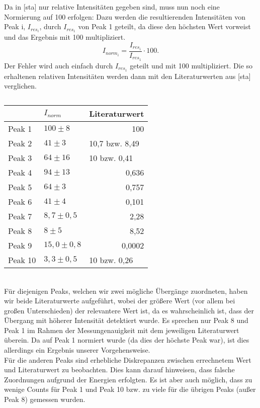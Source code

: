 Da in [sta] nur relative Intensitäten gegeben sind, muss nun noch eine Normierung auf 100 erfolgen: Dazu werden die resultierenden Intensitäten von Peak i, $I_{res_{i}}$, durch $I_{res_{1}}$ von Peak 1 geteilt, da diese den höchsten Wert vorweist und das Ergebnis mit 100 multipliziert. \[I_{norm_{i}}=\frac{I_{res_{i}}}{I_{res_{1}}}\cdot 100.\] 
Der Fehler wird auch einfach durch $I_{res_{1}}$ geteilt und mit 100 multipliziert. Die so erhaltenen relativen Intensitäten werden dann mit den Literaturwerten aus [sta] verglichen.
\begin{table}[htbp]
\begin{center}
\caption{}
\begin{tabular}{|l|l|r|}
\hline
 & $I_{norm}$ & \multicolumn{1}{l|}{Literaturwert} \\ \hline
Peak 1 & $100\pm8$ & 100 \\ \hline
Peak 2 & $41\pm3$ & \multicolumn{1}{l|}{10,7 bzw. 8,49} \\ \hline
Peak 3 & $64\pm16$ & \multicolumn{1}{l|}{10 bzw. 0,41} \\ \hline
Peak 4 & $94\pm13$ & 0,636 \\ \hline
Peak 5 & $64\pm3$ & 0,757 \\ \hline
Peak 6 & $41\pm4$ & 0,101 \\ \hline
Peak 7 & $8,7\pm0,5$ & 2,28 \\ \hline
Peak 8 & $8\pm5$ & 8,52 \\ \hline
Peak 9 & $15,0\pm0,8$ & 0,0002 \\ \hline
Peak 10 & $3,3\pm0,5$ & \multicolumn{1}{l|}{10 bzw. 0,26} \\ \hline
\end{tabular}
\end{center}
\label{}
\end{table}
~\\
Für diejenigen Peaks, welchen wir zwei mögliche Übergänge zuordneten, haben wir beide Literaturwerte aufgeführt, wobei der größere Wert (vor allem bei großen Unterschieden) der relevantere Wert ist, da es wahrscheinlich ist, dass der Übergang mit höherer Intensität detektiert wurde.
Es sprechen nur Peak 8 und Peak 1 im Rahmen der Messungenauigkeit mit dem jeweiligen Literaturwert überein. Da auf Peak 1 normiert wurde (da dies der höchste Peak war), ist dies allerdings ein Ergebnis unserer Vorgehensweise.\\
Für die anderen Peaks sind erhebliche Diskrepanzen zwischen errechnetem Wert und Literaturwert zu beobachten. Dies kann darauf hinweisen, dass falsche Zuordnungen aufgrund der Energien erfolgten. Es ist aber auch möglich, dass zu wenige Counts für Peak 1 und Peak 10 bzw. zu viele für die übrigen Peaks (außer Peak 8) gemessen wurden.
